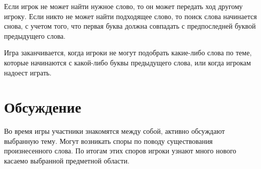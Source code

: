 Если игрок не может найти нужное слово, то он может передать ход другому игроку. Если никто не может найти подходящее слово, то поиск слова начинается снова, с учетом того, что первая буква должна совпадать с предпоследней буквой предыдущего слова.

Игра заканчивается, когда игроки не могут подобрать какие-либо слова по теме, которые начинаются с какой-либо буквы предыдущего слова, или когда игрокам надоест играть.

\chapter{Обсуждение}
Во время игры участники знакомятся между собой, активно обсуждают выбранную тему. Могут возникать споры по поводу существования произнесенного слова. По итогам этих споров игроки узнают много нового касаемо выбранной предметной области.

\newpage